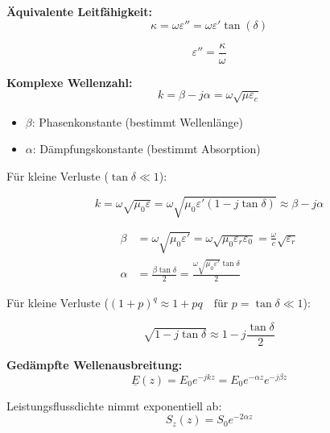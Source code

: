 \textbf{Äquivalente Leitfähigkeit:}
\begin{equation}
\kappa = \omega\varepsilon'' = \omega\varepsilon'\tan(\delta)
\end{equation}

\begin{equation}
\varepsilon'' = \frac{\kappa}{\omega}
\end{equation}

\textbf{Komplexe Wellenzahl:}
\begin{equation}
k = \beta - j\alpha = \omega\sqrt{\mu\varepsilon_c}
\end{equation}

\begin{itemize}
    \item $\beta$: Phasenkonstante (bestimmt Wellenlänge)
    \item $\alpha$: Dämpfungskonstante (bestimmt Absorption)
\end{itemize}


Für kleine Verluste ($\tan \delta \ll 1$):

\begin{equation}
k = \omega\sqrt{\mu_0 \varepsilon} = \omega\sqrt{\mu_0 \varepsilon'(1 - j\tan\delta)} \approx \beta - j\alpha
\end{equation}

\begin{align}
\beta &= \omega\sqrt{\mu_0 \varepsilon'} = \omega\sqrt{\mu_0 \varepsilon_r \varepsilon_0} = \frac{\omega}{c}\sqrt{\varepsilon_r}\\
\alpha &= \frac{\beta \tan \delta}{2} = \frac{\omega\sqrt{\mu_0 \varepsilon'} \tan \delta}{2}
\end{align}


Für kleine Verluste ($(1 + p)^q \approx 1 + pq \quad \text{für } p = \tan \delta \ll 1$):

\begin{equation}
\sqrt{1 - j\tan\delta} \approx 1 - j\frac{\tan\delta}{2}
\end{equation}




\textbf{Gedämpfte Wellenausbreitung:}
\begin{equation}
\underline{E}(z) = E_0 e^{-j k z} = E_0 e^{-\alpha z} e^{-j\beta z}
\end{equation}

Leistungsflussdichte nimmt exponentiell ab:
\begin{equation}
S_z(z) = S_0 e^{-2\alpha z}
\end{equation}

